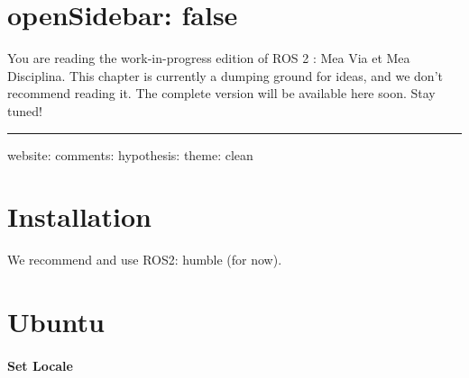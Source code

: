 \documentclass[
  letterpaper,
  DIV=11,
  numbers=noendperiod]{scrreprt}
\begin{document}

\hypertarget{opensidebar-false}{%
\chapter{openSidebar: false}\label{opensidebar-false}}

\begin{tcolorbox}[enhanced jigsaw, coltitle=black, breakable, title=\textcolor{quarto-callout-important-color}{\faExclamation}\hspace{0.5em}{Important}, toprule=.15mm, leftrule=.75mm, colframe=quarto-callout-important-color-frame, colbacktitle=quarto-callout-important-color!10!white, opacitybacktitle=0.6, left=2mm, colback=white, toptitle=1mm, bottomtitle=1mm, titlerule=0mm, arc=.35mm, rightrule=.15mm, opacityback=0, bottomrule=.15mm]

You are reading the work-in-progress edition of ROS 2 : Mea Via et Mea
Disciplina. This chapter is currently a dumping ground for ideas, and we
don't recommend reading it. The complete version will be available here
soon. Stay tuned!

\end{tcolorbox}

\begin{center}\rule{0.5\linewidth}{0.5pt}\end{center}

website: comments: hypothesis: theme: clean


\hypertarget{installation}{%
\chapter{Installation}\label{installation}}

We recommend and use ROS2: humble (for now).


\hypertarget{sec-ubuntu}{%
\chapter{Ubuntu}\label{sec-ubuntu}}

\hypertarget{set-locale}{%
\subsubsection{Set Locale}\label{set-locale}}
\end{document}

